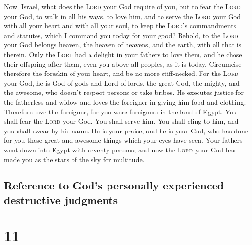  Now, Israel, what does the \textsc{Lord} your God
require of you, but to fear the \textsc{Lord} your God, to walk in all
his ways, to love him, and to serve the \textsc{Lord} your God with all
your heart and with all your soul,  to keep the
\textsc{Lord}'s commandments and statutes, which I command you today for
your good?  Behold, to the \textsc{Lord} your God belongs
heaven, the heaven of heavens, and the earth, with all that is therein.
 Only the \textsc{Lord} had a delight in your fathers to
love them, and he chose their offspring after them, even you above all
peoples, as it is today.  Circumcise therefore the
foreskin of your heart, and be no more stiff-necked.  For
the \textsc{Lord} your God, he is God of gods and Lord of lords, the
great God, the mighty, and the awesome, who doesn't respect persons or
take bribes.  He executes justice for the fatherless and
widow and loves the foreigner in giving him food and clothing.
 Therefore love the foreigner, for you were foreigners in
the land of Egypt.  You shall fear the \textsc{Lord} your
God. You shall serve him. You shall cling to him, and you shall swear by
his name.  He is your praise, and he is your God, who has
done for you these great and awesome things which your eyes have seen.
 Your fathers went down into Egypt with seventy persons;
and now the \textsc{Lord} your God has made you as the stars of the sky
for multitude.

\hypertarget{reference-to-gods-personally-experienced-destructive-judgments}{%
\subsection{Reference to God's personally experienced destructive
judgments}\label{reference-to-gods-personally-experienced-destructive-judgments}}

\hypertarget{section-10}{%
\section{11}\label{section-10}}

